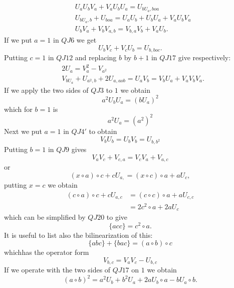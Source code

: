 \begin{align*}
&U_aU_bV_a+V_aU_bU_a=U_{bU_{a},boa}\tag*{QJ16}\\
&U_{bU_{a},b}+U_{boa}=U_aU_b+U_bU_a+V_aU_bV_a\tag{QJ17}\\
&U_bV_a+V_bV_{a,b}=V_{b,a}V_b+V_aU_b\tag*{QJ18}.
\end{align*}
If we put $a=1$ in $QJ6$ we get
\begin{equation*}
U_bV_c+V_cU_b=U_{b,boc}\tag*{QJ19}.
\end{equation*}
Putting $c=1$ in $QJ12$ and replacing $b$ by $b+1$ in $QJ17$ give respectively:
\begin{align*}
&2U_a=V^{2}_a-V_{a^{2}}\tag*{QJ20}\\
&V_{bU_{a}}+U_{a^{2},b}+2U_{a,aob}=U_aV_b=V_bU_a+V_aV_bV_a.\tag*{QJ21}
\end{align*}
If we apply the two sides of $QJ3$ to $1$ we obtain
\begin{equation*}
a^{2}U_bU_a=(b U_a)^{2}\tag*{QJ22}
\end{equation*}\pageoriginale
which for $b=1$ is
\begin{equation*}
a^{2}U_a=(a^{2})^{2}\tag*{QJ23}
\end{equation*}
Next we put $a=1$ in $QJ4'$ to obtain
\begin{equation*}
V_bU_b=U_bV_b=U_{b,b^{2}}\tag*{QJ24}
\end{equation*}
Putting $b=1$ in $QJ9$ gives
\begin{equation*}
V_aV_c+V_{c,a}=V_cV_a+V_{a,c}\tag*{QJ25}
\end{equation*}
or
\begin{equation*}
(x\circ a)\circ c+c U_{a,}=(x\circ c)\circ a + aU_c,\tag*{QJ 25'}
\end{equation*}
putting $x=c$ we obtain
\begin{align*}
(c\circ a)\circ c+c U_{a,c}&=(c\circ c)\circ a+ a U_{c,c}\\
&=2c^{2}\circ a + 2a U_c
\end{align*}
which can be simplified by $QJ 20$ to give
\begin{equation*}
\{acc\}=c^{2}\circ a.\tag*{QJ26}
\end{equation*}
It is useful to list also the bilinearization of this:
\begin{equation*}
\{abc\}+\{bac\}=(a \circ b)\circ c\tag*{QJ 27}
\end{equation*}
which\pageoriginale has the operator form
\begin{equation*}
V_{b,c}=V_aV_c-U_{b,c}\tag*{QJ $27'$}
\end{equation*}
If we operate with the two sides of $QJ17$ on $1$ we obtain
$$
(a \circ b)^{2}=a^{2}U_b+b^{2}U_a+2aU_b\circ a-b U_a\circ b.
$$

